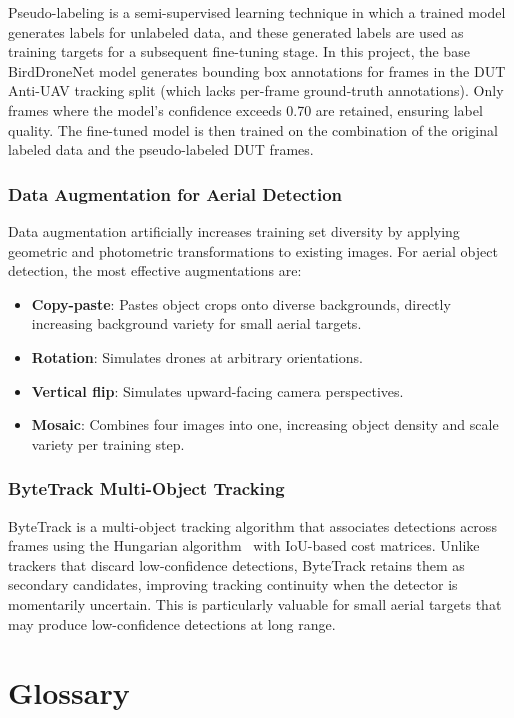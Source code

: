 \documentclass[12pt,a4paper]{report}
\begin{document}
Pseudo-labeling is a semi-supervised learning technique in which a trained
model generates labels for unlabeled data, and these generated labels are
used as training targets for a subsequent fine-tuning stage. In this project,
the base BirdDroneNet model generates bounding box annotations for frames
in the DUT Anti-UAV tracking split (which lacks per-frame ground-truth
annotations). Only frames where the model's confidence exceeds 0.70 are
retained, ensuring label quality. The fine-tuned model is then trained on
the combination of the original labeled data and the pseudo-labeled DUT frames.

\subsection{Data Augmentation for Aerial Detection}

Data augmentation artificially increases training set diversity by applying
geometric and photometric transformations to existing images. For aerial
object detection, the most effective augmentations are:
\begin{itemize}
  \item \textbf{Copy-paste}: Pastes object crops onto diverse backgrounds,
        directly increasing background variety for small aerial targets.
  \item \textbf{Rotation}: Simulates drones at arbitrary orientations.
  \item \textbf{Vertical flip}: Simulates upward-facing camera perspectives.
  \item \textbf{Mosaic}: Combines four images into one, increasing object
        density and scale variety per training step.
\end{itemize}

\subsection{ByteTrack Multi-Object Tracking}

ByteTrack is a multi-object tracking algorithm that associates detections
across frames using the Hungarian algorithm~\cite{kuhn1955hungarian} with IoU-based cost matrices.
Unlike trackers that discard low-confidence detections, ByteTrack retains
them as secondary candidates, improving tracking continuity when the detector
is momentarily uncertain. This is particularly valuable for small aerial
targets that may produce low-confidence detections at long range.

\chapter{Glossary}
\label{app:glossary}
\end{document}
